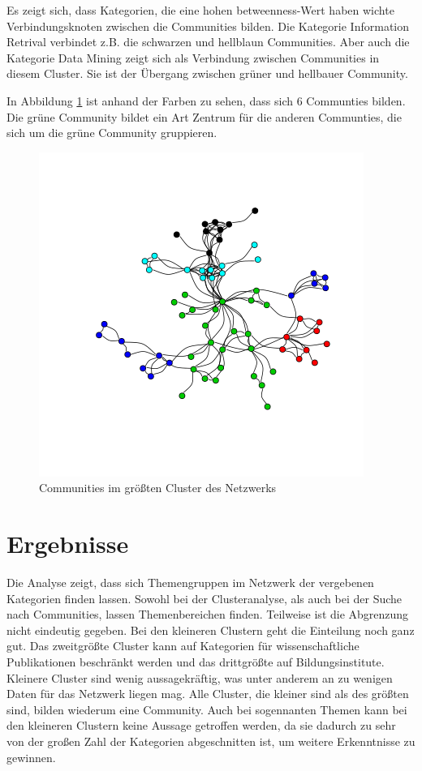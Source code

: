 \documentclass{acm_proc_article-sp}
\begin{document}
Es zeigt sich, dass Kategorien, die eine hohen betweenness-Wert haben wichte Verbindungsknoten zwischen die Communities bilden. Die Kategorie Information Retrival verbindet z.B. die schwarzen und hellblaun Communities. Aber auch die Kategorie Data Mining zeigt sich als Verbindung zwischen Communities in diesem Cluster. Sie ist der Übergang zwischen grüner und hellbauer Community.

In Abbildung \ref{fig:communities} ist anhand der Farben zu sehen, dass sich 6 Communties bilden. Die grüne Community bildet ein Art Zentrum für die anderen Communties, die sich um die grüne Community gruppieren.
\begin{figure}[H]
\centering
\includegraphics[scale=0.6]{../visualization/ml_community_graph.png}
\caption{Communities im größten Cluster des Netzwerks}
\label{fig:communities}
\end{figure}
\section{Ergebnisse}
Die Analyse zeigt, dass sich Themengruppen im Netzwerk der vergebenen Kategorien finden lassen. Sowohl bei der Clusteranalyse, als auch bei der Suche nach Communities, lassen Themenbereichen finden. Teilweise ist die Abgrenzung nicht eindeutig gegeben. Bei den kleineren Clustern geht die Einteilung noch ganz gut. Das zweitgrößte Cluster kann auf Kategorien für wissenschaftliche Publikationen beschränkt werden und das drittgrößte auf Bildungsinstitute.
Kleinere Cluster sind wenig aussagekräftig, was unter anderem an zu wenigen Daten für das Netzwerk liegen mag. Alle Cluster, die kleiner sind als des größten sind, bilden wiederum eine Community. Auch bei sogennanten Themen kann bei den kleineren Clustern keine Aussage getroffen werden, da sie dadurch zu sehr von der großen Zahl der Kategorien abgeschnitten ist, um weitere Erkenntnisse zu gewinnen.
\end{document}
